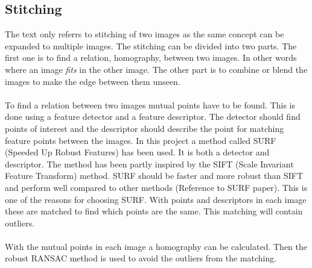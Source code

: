\subsection{Stitching}
The text only referrs to stitching of two images as the same concept can be expanded to multiple images. The stitching can be divided into two parts. The first one is to find a relation, homography, between two images. In other words where an image {\it fits} in the other image. The other part is to combine or blend the images to make the edge between them unseen.
\\\\
To find a relation between two images mutual points have to be found. This is done using a feature detector and a feature descriptor. The detector should find points of interest and the descriptor should describe the point for matching feature points between the images. In this project a method called SURF (Speeded Up Robust Features) has been used. It is both a detector and descriptor. The method has been partly inspired by the SIFT (Scale Invariant Feature Transform) method. SURF should be faster and more robust than SIFT and perform well compared to other methods (Reference to SURF paper). This is one of the reasons for choosing SURF. With points and descriptors in each image these are matched to find which points are the same. This matching will contain outliers.
\\\\
With the mutual points in each image a homography can be calculated. Then the robust RANSAC method is used to avoid the outliers from the matching.


